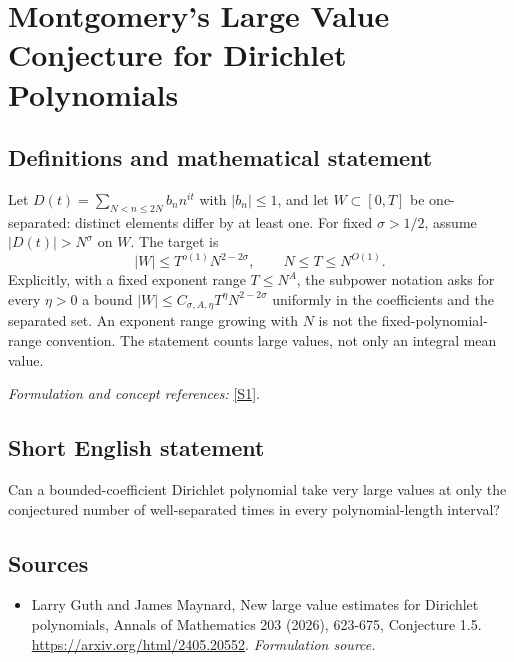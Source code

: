 \documentclass[11pt]{article}
\begin{document}
\section*{\texorpdfstring{Montgomery's Large Value Conjecture for Dirichlet Polynomials}{Montgomery's Large Value Conjecture for Dirichlet Polynomials}}\label{295}
\subsection{Definitions and mathematical statement}
Let $D(t)=\sum_{N<n\le2N}b_n n^{it}$ with $|b_n|\le1$, and let $W\subset[0,T]$ be one-separated: distinct elements differ by at least one. For fixed $\sigma>1/2$, assume $|D(t)|>N^\sigma$ on $W$. The target is
\[
 |W|\le T^{o(1)}N^{2-2\sigma},\qquad N\le T\le N^{O(1)}.
\]
Explicitly, with a fixed exponent range $T\le N^A$, the subpower notation asks for every $\eta>0$ a bound
$|W|\le C_{\sigma,A,\eta}T^\eta N^{2-2\sigma}$ uniformly in the coefficients and the separated set. An exponent range growing with $N$ is not the fixed-polynomial-range convention. The statement counts large values, not only an integral mean value.
\par\smallskip\textit{Formulation and concept references:} \href{https://arxiv.org/html/2405.20552}{[S1]}.

\subsection{Short English statement}
Can a bounded-coefficient Dirichlet polynomial take very large values at only the conjectured number of well-separated times in every polynomial-length interval?
\subsection{Sources}
\begin{itemize}
\item[S1]Larry Guth and James Maynard, New large value estimates for Dirichlet polynomials, Annals of Mathematics 203 (2026), 623-675, Conjecture 1.5.
\url{https://arxiv.org/html/2405.20552}.
\textit{Formulation source.}
\end{itemize}
\end{document}
